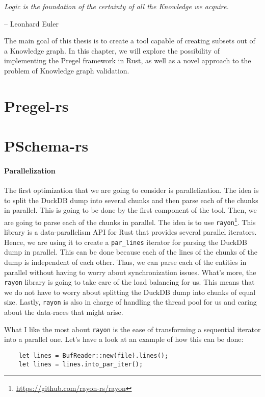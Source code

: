 \epigraph{\textit{Logic is the foundation of the certainty of all the Knowledge we acquire.}}{-- \textup{Leonhard Euler}}

The main goal of this thesis is to create a tool capable of creating subsets out of a Knowledge graph. In this chapter, we will explore the possibility of implementing the Pregel framework in Rust, as well as a novel approach to the problem of Knowledge graph validation.

\section{Pregel-rs}



\section{PSchema-rs}

\paragraph{Parallelization}

The first optimization that we are going to consider is parallelization. The idea is to split the DuckDB dump into several chunks and then parse each of the chunks in parallel. This is going to be done by the first component of the tool. Then, we are going to parse each of the chunks in parallel. The idea is to use \texttt{rayon}\footnote{\url{https://github.com/rayon-rs/rayon}}. This library is a data-parallelism API for Rust that provides several parallel iterators. Hence, we are using it to create a \texttt{par\_lines} iterator for parsing the DuckDB dump in parallel. This can be done because each of the lines of the chunks of the dump is independent of each other. Thus, we can parse each of the entities in parallel without having to worry about synchronization issues. What's more, the \texttt{rayon} library is going to take care of the load balancing for us. This means that we do not have to worry about splitting the DuckDB dump into chunks of equal size. Lastly, \texttt{rayon} is also in charge of handling the thread pool for us and caring about the data-races that might arise.

What I like the most about \texttt{rayon} is the ease of transforming a sequential iterator into a parallel one. Let's have a look at an example of how this can be done:

\begin{verbatim}
    let lines = BufReader::new(file).lines();
    let lines = lines.into_par_iter();
\end{verbatim}

